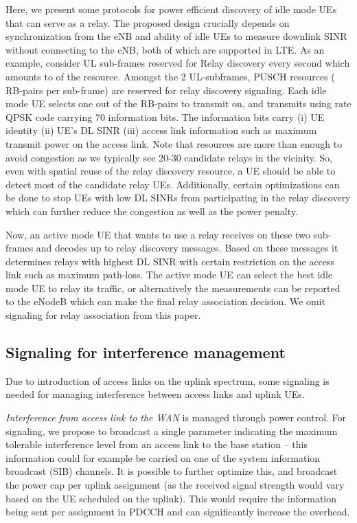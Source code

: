 \documentclass[journal]{IEEEtran}
\begin{document}
Here, we present some protocols for power efficient discovery of idle mode UEs that can serve as a relay. The proposed design crucially depends on synchronization from the eNB and ability of idle UEs to measure downlink SINR without connecting to the eNB, both of which are supported in LTE.
As an example, consider  UL sub-frames reserved for Relay discovery every second which amounts to  of the resource. Amongst the 2 UL-subframes, PUSCH resources ( RB-pairs per sub-frame) are reserved for relay discovery signaling. Each idle mode UE selects one out of the  RB-pairs to transmit on, and transmits using rate  QPSK code carrying 70 information bits. The information bits carry (i) UE identity (ii) UE's DL SINR (iii) access link information such as maximum transmit power on the access link. Note that  resources are more than enough to avoid congestion as we typically see 20-30 candidate relays in the vicinity. So, even with spatial reuse of the relay discovery resource, a UE should be able to detect most of the candidate relay UEs. Additionally, certain optimizations can be done to stop UEs with low DL SINRs from participating in the relay discovery which can further reduce the congestion as well as the power penalty.

Now, an active mode UE that wants to use a relay receives on these two sub-frames and decodes up to  relay discovery messages. Based on these messages it determines relays with highest DL SINR with certain restriction on the access link such as maximum path-loss. The active mode UE can select the best idle mode UE to relay its traffic, or alternatively the measurements can be reported to the eNodeB which can make the final relay association decision. We omit signaling for relay association from this paper.

\subsection{Signaling for interference management}

Due to introduction of access links on the uplink spectrum, some signaling is needed for managing interference between access links and uplink UEs.

{\em Interference from access link to the WAN} is managed through power control. For signaling, we propose to broadcast a single parameter indicating the maximum tolerable interference level from an access link to the base station -- this information could for example be carried on one of the system information broadcast (SIB) channels. It is possible to further optimize this, and broadcast the power cap per uplink assignment (as the received signal strength would vary based on the UE scheduled on the uplink). This would require the information being sent per assignment in PDCCH and can significantly increase the overhead.
\end{document}

